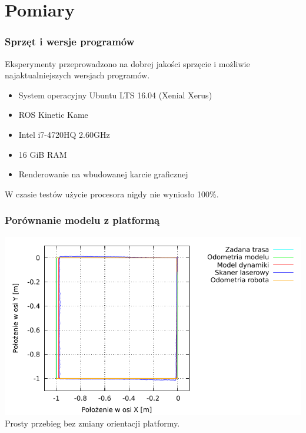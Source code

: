 \documentclass{beamer}
\begin{document}
	
	
	\section{Pomiary}
	\begin{frame}
		\frametitle{Sprzęt i wersje programów}
		Eksperymenty przeprowadzono na dobrej jakości sprzęcie i możliwie najaktualniejszych wersjach programów.
		\begin{itemize}
			\item System operacyjny Ubuntu LTS 16.04 (Xenial Xerus)
			\item ROS Kinetic Kame
		\end{itemize}
		\begin{itemize}
			\item Intel i7-4720HQ 2.60GHz
			\item 16 GiB RAM
			\item Renderowanie na wbudowanej karcie graficznej
		\end{itemize}
		W czasie testów użycie procesora nigdy nie wyniosło 100\%.
	\end{frame}
	
	\begin{frame}
		\frametitle{Porównanie modelu z platformą}
		\centering
		\includegraphics[width=\textwidth]{graphics/velmobil_xy.pdf} \\
		Prosty przebieg bez zmiany orientacji platformy.
	\end{frame}
	
\end{document}
